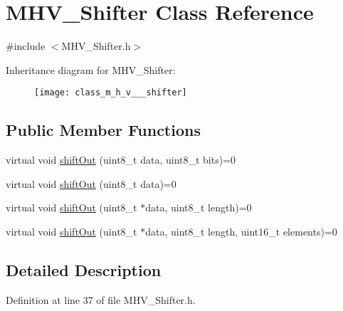 \hypertarget{class_m_h_v___shifter}{\section{M\-H\-V\-\_\-\-Shifter Class Reference}
\label{class_m_h_v___shifter}
}


{\ttfamily \#include $<$M\-H\-V\-\_\-\-Shifter.\-h$>$}

Inheritance diagram for M\-H\-V\-\_\-\-Shifter\-:\begin{figure}[H]
\begin{center}
\leavevmode
\texttt{[image: class\_m\_h\_v\_\_\_shifter]}
\end{center}
\end{figure}
\subsection*{Public Member Functions}
\begin{DoxyCompactItemize}
\item 
virtual void \hyperlink{class_m_h_v___shifter_a4e0972d0c8471a4f53ba8e683a8436f7}{shift\-Out} (uint8\-\_\-t data, uint8\-\_\-t bits)=0
\item 
virtual void \hyperlink{class_m_h_v___shifter_a6c1cc1bc7adb72bfcc7482e1731898d4}{shift\-Out} (uint8\-\_\-t data)=0
\item 
virtual void \hyperlink{class_m_h_v___shifter_a51636cdb41c763615ec27800275ae4dd}{shift\-Out} (uint8\-\_\-t $\ast$data, uint8\-\_\-t length)=0
\item 
virtual void \hyperlink{class_m_h_v___shifter_aa923b774e68afb5ec9d58a4eac30ab34}{shift\-Out} (uint8\-\_\-t $\ast$data, uint8\-\_\-t length, uint16\-\_\-t elements)=0
\end{DoxyCompactItemize}


\subsection{Detailed Description}


Definition at line 37 of file M\-H\-V\-\_\-\-Shifter.\-h.




